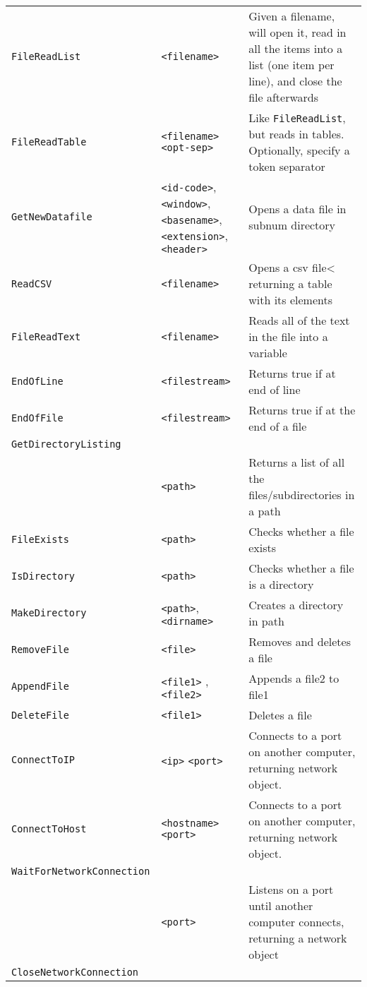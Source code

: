 \begin{longtable}{p{3cm}p{3cm}p{6cm}}
\verb+FileReadList+ &\verb+<filename>+ &Given a filename, will open it, read in all the items into a list (one item per line), and close the file afterwards\\ 
\verb+FileReadTable+ &\verb+<filename>+ \verb+<opt-sep>+ &Like \verb+FileReadList+, but reads in tables. Optionally, specify a token separator\\ 
\verb+GetNewDatafile+&\verb+<id-code>+,\verb+<window>+,\linebreak \verb+<basename>+,\linebreak \verb+<extension>+, \verb+<header>+& Opens a data file in subnum directory\\
\verb+ReadCSV+ &\verb+<filename>+&Opens a csv file< returning a table with its elements\\ 
\verb+FileReadText+ &\verb+<filename>+ &Reads all of the text in the file into a variable\\ 
\verb+EndOfLine+ &\verb+<filestream>+&Returns true if at end of line \\ 
\verb+EndOfFile+ &\verb+<filestream>+&Returns true if at the end of a file\\ 
\verb+GetDirectoryListing+\\
                  &\verb+<path>+&Returns a list of all the files/subdirectories in a path\\
\verb+FileExists+&\verb+<path>+&Checks whether a file exists\\
\verb+IsDirectory+&\verb+<path>+&Checks whether a file is a directory\\
\verb+MakeDirectory+&\verb+<path>+,\verb+<dirname>+&Creates a directory in path\\
\verb+RemoveFile+&\verb+<file>+&Removes and deletes a file \\
\verb+AppendFile+& \verb+<file1>+ ,\verb+<file2>+ & Appends a file2 to file1\\
\verb+DeleteFile+& \verb+<file1>+ & Deletes a file\\
\verb+ConnectToIP+ &\verb+<ip>+ \verb+<port>+&Connects to a port on another computer, returning network object.   \\
\verb+ConnectToHost+&\verb+<hostname>+ \verb+<port>+&Connects to a port on another computer, returning network object.\\
\verb+WaitForNetworkConnection+& & \\ 
& \verb+<port>+&Listens on a port until another computer connects, returning a network object\\
\verb+CloseNetworkConnection+& &\\

\end{longtable}

